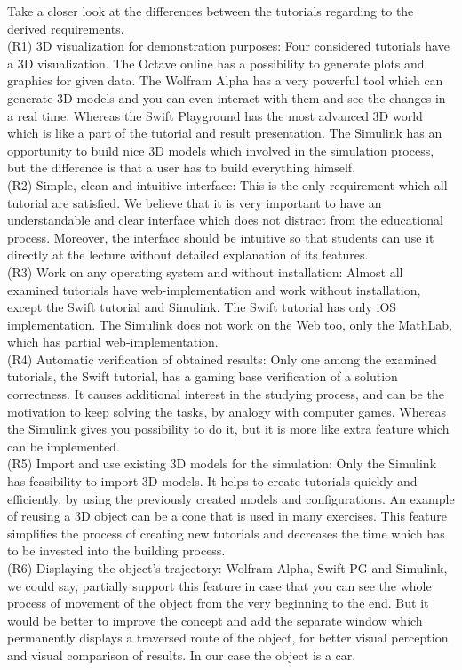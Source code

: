 Take a closer look at the differences between the tutorials regarding to the derived requirements.\\
(R1) 3D visualization for demonstration purposes: Four considered tutorials have a 3D visualization. The Octave online has a possibility to generate plots and graphics for given data. The Wolfram Alpha has a very powerful tool which can generate 3D models and you can even interact with them and see the changes in a real time. Whereas the Swift Playground has the most advanced 3D world which is like a part of the tutorial and result presentation. The Simulink has an opportunity to build nice 3D models which involved in the simulation process, but the difference is that a user has to build everything himself.\\
(R2) Simple, clean and intuitive interface: This is the only requirement which all tutorial are satisfied. We believe that it is very important to have an understandable and clear interface which does not distract from the educational process. Moreover, the interface should be intuitive so that students can use it directly at the lecture without detailed explanation of its features. \\
(R3) Work on any operating system and without installation: Almost all examined tutorials have web-implementation and work without installation, except the Swift tutorial and Simulink. The Swift tutorial has only iOS implementation. The Simulink does not work on the Web too, only the MathLab, which has partial web-implementation.\\
(R4) Automatic verification of obtained results: Only one among the examined tutorials, the Swift tutorial, has a gaming base verification of a solution correctness. It causes additional interest in the studying process, and can be the motivation to keep solving the tasks, by analogy with computer games. Whereas the Simulink gives you possibility to do it, but it is more like extra feature which can be implemented.\\
(R5) Import and use existing 3D models for the simulation: Only the Simulink has feasibility to import 3D models. It helps to create tutorials quickly and efficiently, by using the previously created models and configurations. An example of reusing a 3D object can be a cone that is used in many exercises. This feature simplifies the process of creating new tutorials and decreases the time which has to be invested into the building process.\\
(R6) Displaying the object's trajectory: Wolfram Alpha, Swift PG and Simulink, we could say, partially support this feature in case that you can see the whole process of movement of the object from the very beginning to the end. But it would be better to improve the concept and add the separate window which permanently displays a traversed route of the object, for better visual perception and visual comparison of results. In our case the object is a car.\\
